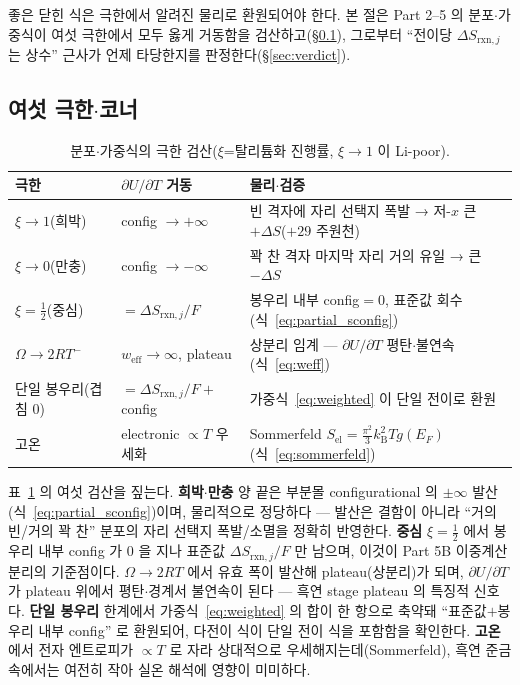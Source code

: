 \documentclass[11pt,a4paper]{article}
\newcommand{\rxn}{\mathrm{rxn}}
\newcommand{\elc}{\mathrm{el}}
\newcommand{\eff}{\mathrm{eff}}
\newcommand{\kB}{k_{\mathrm B}}
\begin{document}
좋은 닫힌 식은 극한에서 알려진 물리로 환원되어야 한다. 본 절은 Part 2--5 의 분포$\cdot$가중식이 여섯
극한에서 모두 옳게 거동함을 검산하고(\S\ref{sec:corners}), 그로부터 ``전이당 $\Delta S_{\rxn,j}$ 는 상수''
근사가 언제 타당한지를 판정한다(\S\ref{sec:verdict}).

\subsection{여섯 극한$\cdot$코너}\label{sec:corners}
\begin{table}[t]
\centering\small
\renewcommand{\arraystretch}{1.3}
\caption{분포$\cdot$가중식의 극한 검산($\xi$=탈리튬화 진행률, $\xi\to1$ 이 Li-poor).}
\label{tab:limits}
\begin{tabular}{l l l}
\toprule
극한 & $\partial U/\partial T$ 거동 & 물리$\cdot$검증 \\
\midrule
$\xi\to1$(희박) & config $\to+\infty$ & 빈 격자에 자리 선택지 폭발 → 저-$x$ 큰 $+\Delta S$($+29$ 주원천) \\
$\xi\to0$(만충) & config $\to-\infty$ & 꽉 찬 격자 마지막 자리 거의 유일 → 큰 $-\Delta S$ \\
$\xi=\tfrac12$(중심) & $=\Delta S_{\rxn,j}/F$ & 봉우리 내부 config$=0$, 표준값 회수(식~\eqref{eq:partial_sconfig}) \\
$\Omega\to2RT^-$ & $w_\eff\to\infty$, plateau & 상분리 임계 — $\partial U/\partial T$ 평탄$\cdot$불연속(식~\eqref{eq:weff}) \\
단일 봉우리(겹침 0) & $=\Delta S_{\rxn,j}/F+$config & 가중식~\eqref{eq:weighted} 이 단일 전이로 환원 \\
고온 & electronic $\propto T$ 우세화 & Sommerfeld $S_\elc=\tfrac{\pi^2}{3}\kB^2 T g(E_F)$(식~\eqref{eq:sommerfeld}) \\
\bottomrule
\end{tabular}
\end{table}
표~\ref{tab:limits} 의 여섯 검산을 짚는다. \textbf{희박$\cdot$만충} 양 끝은 부분몰 configurational 의
$\pm\infty$ 발산(식~\eqref{eq:partial_sconfig})이며, 물리적으로 정당하다 — 발산은 결함이 아니라 ``거의 빈/거의
꽉 찬'' 분포의 자리 선택지 폭발/소멸을 정확히 반영한다. \textbf{중심} $\xi=\tfrac12$ 에서 봉우리 내부
config 가 $0$ 을 지나 표준값 $\Delta S_{\rxn,j}/F$ 만 남으며, 이것이 Part 5B 이중계산 분리의 기준점이다.
\textbf{$\Omega\to2RT$} 에서 유효 폭이 발산해 plateau(상분리)가 되며, $\partial U/\partial T$ 가 plateau
위에서 평탄$\cdot$경계서 불연속이 된다 — 흑연 stage plateau 의 특징적 신호다. \textbf{단일 봉우리} 한계에서
가중식~\eqref{eq:weighted} 의 합이 한 항으로 축약돼 ``표준값$+$봉우리 내부 config'' 로 환원되어, 다전이
식이 단일 전이 식을 포함함을 확인한다. \textbf{고온} 에서 전자 엔트로피가 $\propto T$ 로 자라 상대적으로
우세해지는데(Sommerfeld), 흑연 준금속에서는 여전히 작아 실온 해석에 영향이 미미하다.
\end{document}
